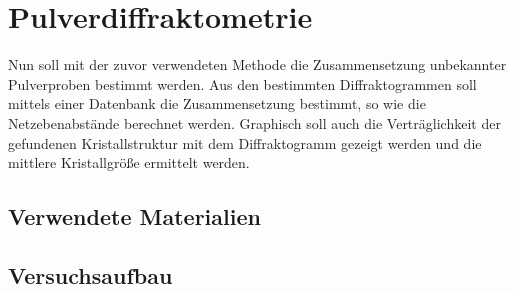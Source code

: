 \section{Pulverdiffraktometrie}
Nun soll mit der zuvor verwendeten Methode die Zusammensetzung unbekannter Pulverproben bestimmt werden. Aus den bestimmten Diffraktogrammen soll mittels einer Datenbank die Zusammensetzung bestimmt, so wie die Netzebenabstände berechnet werden. Graphisch soll auch die Verträglichkeit der gefundenen Kristallstruktur mit dem Diffraktogramm gezeigt werden und die mittlere Kristallgröße ermittelt werden.
\subsection{Verwendete Materialien}
\subsection{Versuchsaufbau}
